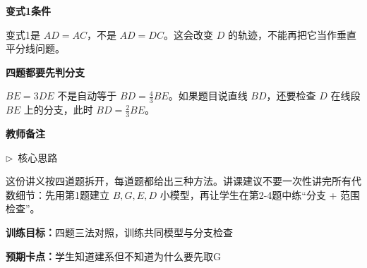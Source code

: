 \documentclass{exam-zh}
\newcommand{\edukai}{\kaishu}
\newcommand{\eduSectionTitle}[1]{%
  \needspace{5\baselineskip}%
  \vspace{2mm}
  {\color{edu-blue}\bfseries\large #1}\par
  \vspace{3mm}
}
\newcommand{\eduSubTitle}[1]{%
  \needspace{4\baselineskip}%
  \vspace{1mm}
  {\color{edu-blue}\bfseries #1}\par
  \vspace{1mm}
}
\newenvironment{eduAuxItem}[1]{%
  \needspace{4\baselineskip}%
  \vspace{2mm}
  \par\noindent
  \hangindent=8mm\hangafter=1
  {\color{edu-blue}\edukai $\triangleright$~#1}\enspace
  \begingroup
  \color{edu-ink}
  \edukai
}{%
  \endgroup
  \par
  \vspace{4mm}
}
\begin{document}
\begin{eduMistakeBox}
\eduSubTitle{变式1条件}变式1是 $AD=AC$，不是 $AD=DC$。这会改变 $D$ 的轨迹，不能再把它当作垂直平分线问题。
\end{eduMistakeBox}




\begin{eduMistakeBox}
\eduSubTitle{四题都要先判分支}$BE=3DE$ 不是自动等于 $BD=\frac43BE$。如果题目说直线 $BD$，还要检查 $D$ 在线段 $BE$ 上的分支，此时 $BD=\frac23BE$。
\end{eduMistakeBox}



\clearpage
\eduSectionTitle{教师备注}

\begin{eduAuxItem}{核心思路}
这份讲义按四道题拆开，每道题都给出三种方法。讲课建议不要一次性讲完所有代数细节：先用第1题建立 $B,G,E,D$ 小模型，再让学生在第2-4题中练“分支 + 范围检查”。
\end{eduAuxItem}


\begin{eduTeacherNote}
  \textbf{训练目标：}四题三法对照，训练共同模型与分支检查\par
  \textbf{预期卡点：}学生知道建系但不知道为什么要先取G
\end{eduTeacherNote}
\end{document}
